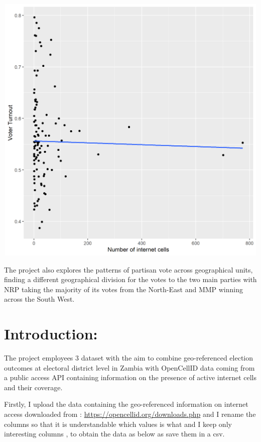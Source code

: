 \documentclass[
]{article}
\begin{document}
\includegraphics[width=6.25in,height=5.20833in]{lm.png}

The project also explores the patterns of partisan vote across
geographical units, finding a different geographical division for the
votes to the two main parties with NRP taking the majority of its votes
from the North-East and MMP winning across the South West.

\hypertarget{introduction}{%
\section{Introduction:}\label{introduction}}

The project employees 3 dataset with the aim to combine geo-referenced
election outcomes at electoral district level in Zambia with OpenCellID
data coming from a public access API containing information on the
presence of active internet cells and their coverage.

Firstly, I upload the data containing the geo-referenced information on
internet access downloaded from :
\url{https://opencellid.org/downloads.php} and I rename the columns so
that it is understandable which values is what and I keep only
interesting columns , to obtain the data as below as save them in a csv.
\end{document}
